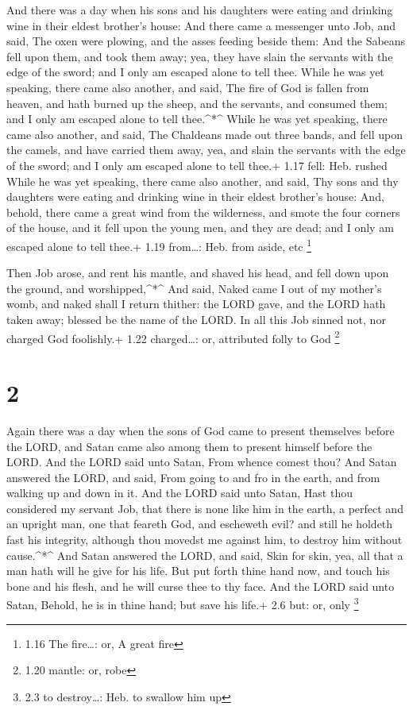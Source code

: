  And there was a day when his sons and his daughters were
eating and drinking wine in their eldest brother's house: 
And there came a messenger unto Job, and said, The oxen were plowing,
and the asses feeding beside them:  And the Sabeans fell
upon them, and took them away; yea, they have slain the servants with
the edge of the sword; and I only am escaped alone to tell thee.
 While he was yet speaking, there came also another, and
said, The fire of God is fallen from heaven, and hath burned up the
sheep, and the servants, and consumed them; and I only am escaped alone
to tell thee.\^{}*\^{}  While he was yet speaking, there
came also another, and said, The Chaldeans made out three bands, and
fell upon the camels, and have carried them away, yea, and slain the
servants with the edge of the sword; and I only am escaped alone to tell
thee.+ 1.17 fell: Heb. rushed  While he was yet speaking,
there came also another, and said, Thy sons and thy daughters were
eating and drinking wine in their eldest brother's house: 
And, behold, there came a great wind from the wilderness, and smote the
four corners of the house, and it fell upon the young men, and they are
dead; and I only am escaped alone to tell thee.+ 1.19 from\ldots: Heb.
from aside, etc \footnote{1.16 The fire\ldots: or, A great fire}

 Then Job arose, and rent his mantle, and shaved his head,
and fell down upon the ground, and worshipped,\^{}*\^{} 
And said, Naked came I out of my mother's womb, and naked shall I return
thither: the LORD gave, and the LORD hath taken away; blessed be the
name of the LORD.  In all this Job sinned not, nor charged
God foolishly.+ 1.22 charged\ldots: or, attributed folly to God
\footnote{1.20 mantle: or, robe}

\hypertarget{section-1}{%
\section{2}\label{section-1}}

 Again there was a day when the sons of God came to present
themselves before the LORD, and Satan came also among them to present
himself before the LORD.  And the LORD said unto Satan, From
whence comest thou? And Satan answered the LORD, and said, From going to
and fro in the earth, and from walking up and down in it. 
And the LORD said unto Satan, Hast thou considered my servant Job, that
there is none like him in the earth, a perfect and an upright man, one
that feareth God, and escheweth evil? and still he holdeth fast his
integrity, although thou movedst me against him, to destroy him without
cause.\^{}*\^{}  And Satan answered the LORD, and said, Skin
for skin, yea, all that a man hath will he give for his life.
 But put forth thine hand now, and touch his bone and his
flesh, and he will curse thee to thy face.  And the LORD
said unto Satan, Behold, he is in thine hand; but save his life.+ 2.6
but: or, only \footnote{2.3 to destroy\ldots: Heb. to swallow him up}

